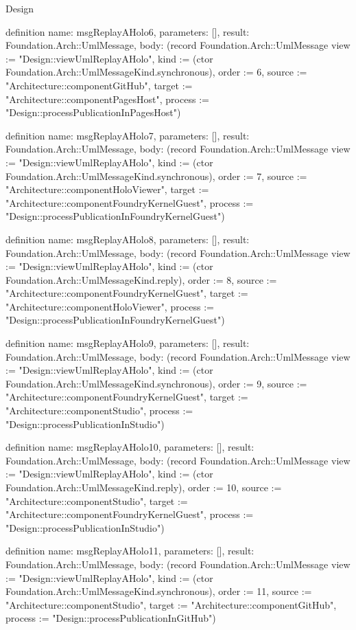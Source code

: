 \begin{lexlean}{Design}
\begin{semanticmodule}
definition{
  name: msgReplayAHolo6,
  parameters: [],
  result: Foundation.Arch::UmlMessage,
  body: (record Foundation.Arch::UmlMessage {view := "Design::viewUmlReplayAHolo", kind := (ctor Foundation.Arch::UmlMessageKind.synchronous), order := 6, source := "Architecture::componentGitHub", target := "Architecture::componentPagesHost", process := "Design::processPublicationInPagesHost"})
}

definition{
  name: msgReplayAHolo7,
  parameters: [],
  result: Foundation.Arch::UmlMessage,
  body: (record Foundation.Arch::UmlMessage {view := "Design::viewUmlReplayAHolo", kind := (ctor Foundation.Arch::UmlMessageKind.synchronous), order := 7, source := "Architecture::componentHoloViewer", target := "Architecture::componentFoundryKernelGuest", process := "Design::processPublicationInFoundryKernelGuest"})
}

definition{
  name: msgReplayAHolo8,
  parameters: [],
  result: Foundation.Arch::UmlMessage,
  body: (record Foundation.Arch::UmlMessage {view := "Design::viewUmlReplayAHolo", kind := (ctor Foundation.Arch::UmlMessageKind.reply), order := 8, source := "Architecture::componentFoundryKernelGuest", target := "Architecture::componentHoloViewer", process := "Design::processPublicationInFoundryKernelGuest"})
}

definition{
  name: msgReplayAHolo9,
  parameters: [],
  result: Foundation.Arch::UmlMessage,
  body: (record Foundation.Arch::UmlMessage {view := "Design::viewUmlReplayAHolo", kind := (ctor Foundation.Arch::UmlMessageKind.synchronous), order := 9, source := "Architecture::componentFoundryKernelGuest", target := "Architecture::componentStudio", process := "Design::processPublicationInStudio"})
}

definition{
  name: msgReplayAHolo10,
  parameters: [],
  result: Foundation.Arch::UmlMessage,
  body: (record Foundation.Arch::UmlMessage {view := "Design::viewUmlReplayAHolo", kind := (ctor Foundation.Arch::UmlMessageKind.reply), order := 10, source := "Architecture::componentStudio", target := "Architecture::componentFoundryKernelGuest", process := "Design::processPublicationInStudio"})
}

definition{
  name: msgReplayAHolo11,
  parameters: [],
  result: Foundation.Arch::UmlMessage,
  body: (record Foundation.Arch::UmlMessage {view := "Design::viewUmlReplayAHolo", kind := (ctor Foundation.Arch::UmlMessageKind.synchronous), order := 11, source := "Architecture::componentStudio", target := "Architecture::componentGitHub", process := "Design::processPublicationInGitHub"})
}


\end{semanticmodule}
\end{lexlean}
